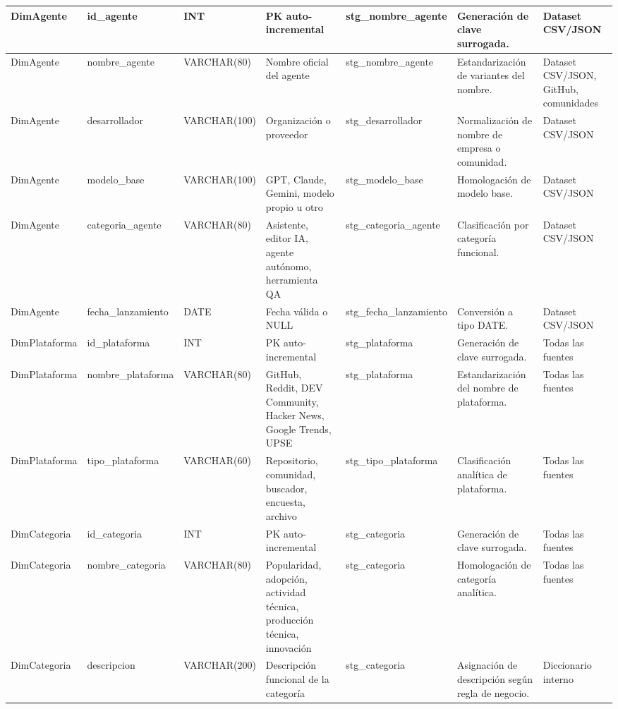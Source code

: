 \documentclass[12pt,a4paper]{article}
\begin{document}
\begin{landscape}
\begin{longtable}{|P{3.55cm}|P{3.05cm}|P{2.35cm}|P{4.00cm}|P{3.95cm}|P{4.95cm}|P{3.05cm}|}
DimAgente & id\_agente & INT & PK auto-incremental & stg\_nombre\_agente & Generación de clave surrogada. & Dataset CSV/JSON \\ \hline
DimAgente & nombre\_agente & VARCHAR(80) & Nombre oficial del agente & stg\_nombre\_agente & Estandarización de variantes del nombre. & Dataset CSV/JSON, GitHub, comunidades \\ \hline
DimAgente & desarrollador & VARCHAR(100) & Organización o proveedor & stg\_desarrollador & Normalización de nombre de empresa o comunidad. & Dataset CSV/JSON \\ \hline
DimAgente & modelo\_base & VARCHAR(100) & GPT, Claude, Gemini, modelo propio u otro & stg\_modelo\_base & Homologación de modelo base. & Dataset CSV/JSON \\ \hline
DimAgente & categoria\_agente & VARCHAR(80) & Asistente, editor IA, agente autónomo, herramienta QA & stg\_categoria\_agente & Clasificación por categoría funcional. & Dataset CSV/JSON \\ \hline
DimAgente & fecha\_lanzamiento & DATE & Fecha válida o NULL & stg\_fecha\_lanzamiento & Conversión a tipo DATE. & Dataset CSV/JSON \\ \hline

DimPlataforma & id\_plataforma & INT & PK auto-incremental & stg\_plataforma & Generación de clave surrogada. & Todas las fuentes \\ \hline
DimPlataforma & nombre\_plataforma & VARCHAR(80) & GitHub, Reddit, DEV Community, Hacker News, Google Trends, UPSE & stg\_plataforma & Estandarización del nombre de plataforma. & Todas las fuentes \\ \hline
DimPlataforma & tipo\_plataforma & VARCHAR(60) & Repositorio, comunidad, buscador, encuesta, archivo & stg\_tipo\_plataforma & Clasificación analítica de plataforma. & Todas las fuentes \\ \hline

DimCategoria & id\_categoria & INT & PK auto-incremental & stg\_categoria & Generación de clave surrogada. & Todas las fuentes \\ \hline
DimCategoria & nombre\_categoria & VARCHAR(80) & Popularidad, adopción, actividad técnica, producción técnica, innovación & stg\_categoria & Homologación de categoría analítica. & Todas las fuentes \\ \hline
DimCategoria & descripcion & VARCHAR(200) & Descripción funcional de la categoría & stg\_categoria & Asignación de descripción según regla de negocio. & Diccionario interno \\ \hline


\end{longtable}
\end{landscape}
\end{document}
